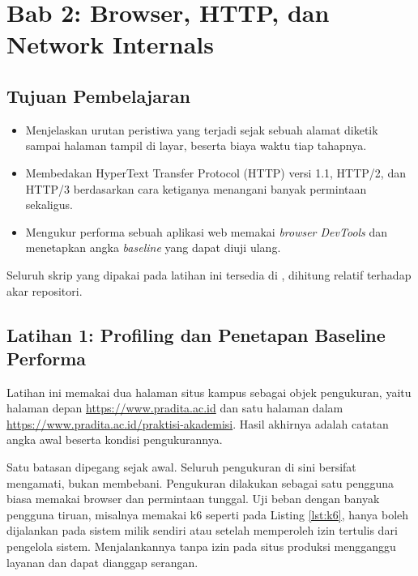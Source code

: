 \section{Bab 2: Browser, HTTP, dan Network Internals}

\subsection*{Tujuan Pembelajaran}
\begin{itemize}
  \item Menjelaskan urutan peristiwa yang terjadi sejak sebuah alamat diketik
        sampai halaman tampil di layar, beserta biaya waktu tiap tahapnya.
  \item Membedakan HyperText Transfer Protocol (HTTP) versi 1.1, HTTP/2, dan
        HTTP/3 berdasarkan cara ketiganya menangani banyak permintaan
        sekaligus.
  \item Mengukur performa sebuah aplikasi web memakai \textit{browser DevTools}
        dan menetapkan angka \textit{baseline} yang dapat diuji ulang.
\end{itemize}

Seluruh skrip yang dipakai pada latihan ini tersedia di
, dihitung relatif terhadap akar repositori.

\subsection*{Latihan 1: Profiling dan Penetapan Baseline Performa}

Latihan ini memakai dua halaman situs kampus sebagai objek pengukuran, yaitu
halaman depan \url{https://www.pradita.ac.id} dan satu halaman dalam
\url{https://www.pradita.ac.id/praktisi-akademisi}. Hasil akhirnya adalah catatan angka awal beserta
kondisi pengukurannya.

Satu batasan dipegang sejak awal. Seluruh pengukuran di sini bersifat mengamati,
bukan membebani. Pengukuran dilakukan sebagai satu pengguna biasa memakai
browser dan permintaan tunggal. Uji beban dengan banyak pengguna tiruan,
misalnya memakai k6 seperti pada Listing \ref{lst:k6}, hanya boleh dijalankan
pada sistem milik sendiri atau setelah memperoleh izin tertulis dari pengelola
sistem. Menjalankannya tanpa izin pada situs produksi mengganggu layanan dan
dapat dianggap serangan.


